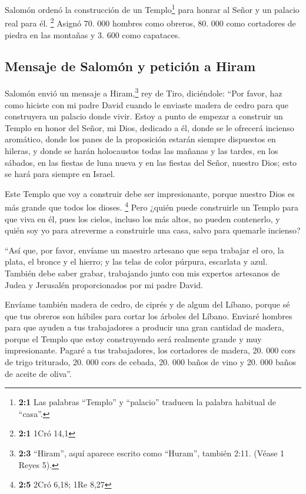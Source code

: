  Salomón ordenó la construcción de un Templo\footnote{\textbf{2:1}
  Las palabras ``Templo'' y ``palacio'' traducen la palabra habitual de
  ``casa''.} para honrar al Señor y un palacio real para él. \footnote{\textbf{2:1}
  1Cró 14,1}  Asignó 70. 000 hombres como obreros, 80. 000
como cortadores de piedra en las montañas y 3. 600 como capataces.

\hypertarget{mensaje-de-salomuxf3n-y-peticiuxf3n-a-hiram}{%
\subsection{Mensaje de Salomón y petición a
Hiram}\label{mensaje-de-salomuxf3n-y-peticiuxf3n-a-hiram}}

 Salomón envió un mensaje a Hiram,\footnote{\textbf{2:3}
  ``Hiram'', aquí aparece escrito como ``Huram'', también 2:11. (Véase 1
  Reyes 5).} rey de Tiro, diciéndole:  ``Por favor, haz
como hiciste con mi padre David cuando le enviaste madera de cedro para
que construyera un palacio donde vivir. Estoy a punto de empezar a
construir un Templo en honor del Señor, mi Dios, dedicado a él, donde se
le ofrecerá incienso aromático, donde los panes de la proposición
estarán siempre dispuestos en hileras, y donde se harán holocaustos
todas las mañanas y las tardes, en los sábados, en las fiestas de luna
nueva y en las fiestas del Señor, nuestro Dios; esto se hará para
siempre en Israel.

 Este Templo que voy a construir debe ser impresionante,
porque nuestro Dios es más grande que todos los dioses. \footnote{\textbf{2:5}
  2Cró 6,18; 1Re 8,27}  Pero ¿quién puede construirle un
Templo para que viva en él, pues los cielos, incluso los más altos, no
pueden contenerlo, y quién soy yo para atreverme a construirle una casa,
salvo para quemarle incienso?

 ``Así que, por favor, envíame un maestro artesano que
sepa trabajar el oro, la plata, el bronce y el hierro; y las telas de
color púrpura, escarlata y azul. También debe saber grabar, trabajando
junto con mis expertos artesanos de Judea y Jerusalén proporcionados por
mi padre David.

 Envíame también madera de cedro, de ciprés y de algum del
Líbano, porque sé que tus obreros son hábiles para cortar los árboles
del Líbano. Enviaré hombres para que ayuden a tus trabajadores
 a producir una gran cantidad de madera, porque el Templo
que estoy construyendo será realmente grande y muy impresionante.
 Pagaré a tus trabajadores, los cortadores de madera, 20.
000 cors de trigo triturado, 20. 000 cors de cebada, 20. 000 baños de
vino y 20. 000 baños de aceite de oliva''.

